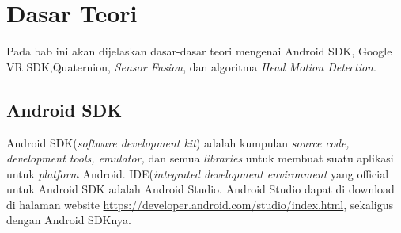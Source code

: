 \chapter{Dasar Teori}
\label{chap:dasar_teori}
Pada bab ini akan dijelaskan dasar-dasar teori mengenai Android SDK, Google VR SDK,Quaternion, \textit{Sensor Fusion}, dan algoritma \textit{Head Motion Detection}.

\section{Android SDK}
\label{sec:android_sdk}

Android SDK(\textit{software development kit}) adalah kumpulan \textit{source code, development tools, emulator,}\cite{developers2011android} dan semua \textit{libraries} untuk membuat suatu aplikasi untuk \textit{platform} Android. IDE(\textit{integrated development environment} yang official untuk Android SDK adalah Android Studio. Android Studio dapat di download di halaman website \url{https://developer.android.com/studio/index.html}, sekaligus dengan Android SDKnya. 
